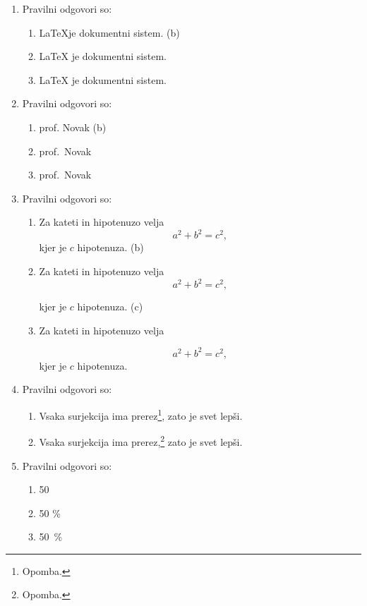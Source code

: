 \documentclass[11pt]{article}
\begin{document}
\begin{enumerate}
    \item Pravilni odgovori so: %
    \begin{enumerate}
        \item \LaTeX je dokumentni sistem.
         (b)
        \item {\LaTeX} je dokumentni sistem.
        \item \LaTeX{} je dokumentni sistem.
    \end{enumerate}

    \item Pravilni odgovori so: %
    \begin{enumerate}
        \item prof. Novak
         (b)
        \item prof.~Novak
        \item prof.\ Novak
    \end{enumerate}

    \item Pravilni odgovori so: %
    \begin{enumerate}
         (a)
        \item
Za kateti in hipotenuzo velja
\[
  a^2 + b^2 = c^2,
\]
kjer je \(c\) hipotenuza.
         (b)
        \item
Za kateti in hipotenuzo velja
\[
  a^2 + b^2 = c^2,
\]

kjer je \(c\) hipotenuza.
         (c)
        \item
Za kateti in hipotenuzo velja

\[
  a^2 + b^2 = c^2,
\]
kjer je \(c\) hipotenuza.
    \end{enumerate}

    \item Pravilni odgovori so: %
    \begin{enumerate}
        \item Vsaka surjekcija ima prerez\footnote{Opomba.}, zato je svet lepši.
        \item Vsaka surjekcija ima prerez,\footnote{Opomba.} zato je svet lepši.
    \end{enumerate}

    \item Pravilni odgovori so: %
    \begin{enumerate}
         (a)
        \item 50 %
        \item 50 \%
        \item 50~\%
    \end{enumerate}


\end{enumerate}
\end{document}
